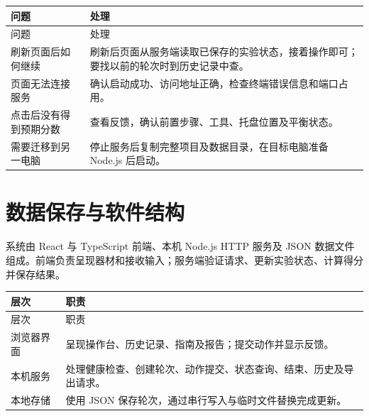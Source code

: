 \documentclass[UTF8,fontset=windows,zihao=-4]{ctexart}
\begin{document}
\begin{longtable}{@{}p{38mm}p{114mm}@{}}

\toprule

问题 & 处理 \\

\midrule

\endfirsthead

\toprule

问题 & 处理 \\

\midrule

\endhead

刷新页面后如何继续 & 刷新后页面从服务端读取已保存的实验状态，接着操作即可；要找以前的轮次时到历史记录中查。 \\

页面无法连接服务 & 确认启动成功、访问地址正确，检查终端错误信息和端口占用。 \\

点击后没有得到预期分数 & 查看反馈，确认前置步骤、工具、托盘位置及平衡状态。 \\

需要迁移到另一电脑 & 停止服务后复制完整项目及数据目录，在目标电脑准备 Node.js 后启动。 \\

\bottomrule

\end{longtable}

\section{数据保存与软件结构}

系统由 React 与 TypeScript 前端、本机 Node.js HTTP 服务及 JSON 数据文件组成。前端负责呈现器材和接收输入；服务端验证请求、更新实验状态、计算得分并保存结果。

\begin{longtable}{@{}p{38mm}p{114mm}@{}}

\toprule

层次 & 职责 \\

\midrule

\endfirsthead

\toprule

层次 & 职责 \\

\midrule

\endhead

浏览器界面 & 呈现操作台、历史记录、指南及报告；提交动作并显示反馈。 \\

本机服务 & 处理健康检查、创建轮次、动作提交、状态查询、结束、历史及导出请求。 \\

本地存储 & 使用 JSON 保存轮次，通过串行写入与临时文件替换完成更新。 \\

\bottomrule

\end{longtable}
\end{document}
